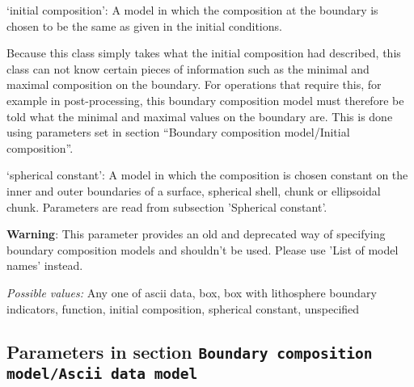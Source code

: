 \begin{itemize}
`initial composition': A model in which the composition at the boundary is chosen to be the same as given in the initial conditions.

Because this class simply takes what the initial composition had described, this class can not know certain pieces of information such as the minimal and maximal composition on the boundary. For operations that require this, for example in post-processing, this boundary composition model must therefore be told what the minimal and maximal values on the boundary are. This is done using parameters set in section ``Boundary composition model/Initial composition''.

`spherical constant': A model in which the composition is chosen constant on the inner and outer boundaries of a surface, spherical shell, chunk or ellipsoidal chunk. Parameters are read from subsection 'Spherical constant'.

\textbf{Warning}: This parameter provides an old and deprecated way of specifying boundary composition models and shouldn't be used. Please use 'List of model names' instead.


{\it Possible values:} Any one of ascii data, box, box with lithosphere boundary indicators, function, initial composition, spherical constant, unspecified
\end{itemize}



\subsection{Parameters in section \tt Boundary composition model/Ascii data model}
\label{parameters:Boundary_20composition_20model/Ascii_20data_20model}

